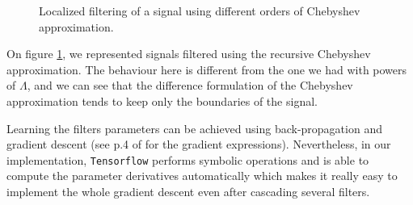 \begin{figure}
    \centering
    \caption{Localized filtering of a signal using different orders of Chebyshev approximation.}
    \label{fig:chebyshev_filtered}
\end{figure}

On figure \ref{fig:chebyshev_filtered}, we represented signals filtered using the recursive Chebyshev approximation. The behaviour here is different from the one we had with powers of $\Lambda$, and we can see that the difference formulation of the Chebyshev approximation tends to keep only the boundaries of the signal.

Learning the filters parameters can be achieved using back-propagation and gradient descent (see p.4 of \cite{defferrard2016convolutional} for the gradient expressions). Nevertheless, in our implementation, \texttt{Tensorflow} performs symbolic operations and is able to compute the parameter derivatives automatically which makes it really easy to implement the whole gradient descent even after cascading several filters.\\

